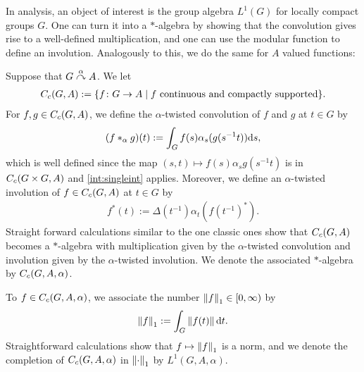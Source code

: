 In analysis, an object of interest is the group algebra $L^1(G)$ for locally compact groups $G$. One can turn it into a $*$-algebra by showing that the convolution gives rise to a well-defined multiplication, and one can use the modular function to define an involution. Analogously to this, we do the same for $A$ valued functions:
\begin{definition}
Suppose that $G \stackrel{\alpha}{\curvearrowright} A$. We let 
\begin{align*}
	C_c(G,A):=\{ f \colon G \to A \mid f \text{ continuous and compactly supported}\}.
\end{align*}
For $f,g \in C_c(G,A)$, we define the $\alpha$-twisted convolution of $f$ and $g$ at $t \in G$ by
\begin{align*}
	(f \ast_\alpha g)(t):= \int_G  f(s) \alpha_s(g(s^{-1}t)) \mathrm{d} s,
\end{align*}
which is well defined since the map $(s,t) \mapsto f(s) \alpha_s g(s^{-1}t)$ is in $C_c(G \times G , A)$ and \cref{int:singleint} applies. Moreover, we define an $\alpha$-twisted involution of $f \in C_c(G,A)$ at $t \in G$ by
\begin{align*}
	f^*(t):=\Delta(t^{-1}) \alpha_t(f(t^{-1})^*).
\end{align*}
Straight forward calculations similar to the one classic ones show that $C_c(G,A)$ becomes a $*$-algebra with multiplication given by the $\alpha$-twisted convolution and involution given by the $\alpha$-twisted involution. We denote the associated $*$-algebra by $C_c(G,A,\alpha)$.

To $f \in C_c(G,A,\alpha)$, we associate the number $\left\lVert f \right\rVert_1 \in [0, \infty)$ by
	\begin{align*}
		\left\lVert f \right\rVert_1 := \int_G \left\lVert f(t) \right\rVert \mathrm{d} t.
	\end{align*}
Straightforward calculations show that $f \mapsto \left\lVert f \right\rVert_1$ is a norm, and we denote the completion of $C_c(G,A,\alpha)$ in $\left\lVert \cdot \right\rVert_1$ by $L^1(G,A,\alpha)$.
\end{definition}

